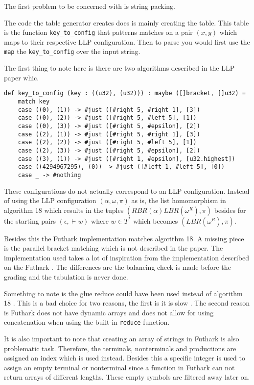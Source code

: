The first problem to be concerned with is string packing. 

The code the table generator creates does is mainly creating the table. This table is the function \lstinline|key_to_config| that patterns matches on a pair $(x, y)$ which maps to their respective LLP configuration. Then to parse you would first use the \lstinline|map| the \lstinline|key_to_config| over the input string.

The first thing to note here is there are two algorithms described in the LLP paper \cite{Vagner2007} whic. 

\begin{lstlisting}[basicstyle=\ttfamily\scriptsize]
def key_to_config (key : ((u32), (u32))) : maybe ([]bracket, []u32) =
    match key
    case ((0), (1)) -> #just ([#right 5, #right 1], [3])
    case ((0), (2)) -> #just ([#right 5, #left 5], [1])
    case ((0), (3)) -> #just ([#right 5, #epsilon], [2])
    case ((2), (1)) -> #just ([#right 5, #right 1], [3])
    case ((2), (2)) -> #just ([#right 5, #left 5], [1])
    case ((2), (3)) -> #just ([#right 5, #epsilon], [2])
    case ((3), (1)) -> #just ([#right 1, #epsilon], [u32.highest])
    case ((4294967295), (0)) -> #just ([#left 1, #left 5], [0])
    case _ -> #nothing
\end{lstlisting}


These configurations do not actually correspond to an LLP configuration. Instead of using the LLP configuration $(\alpha, \omega, \pi)$ as is, the list homomorphism in algorithm 18 \cite[18]{Vagner2007} which results in the tuples $(RBR(\alpha)LBR(\omega^R), \pi)$ besides for the starting pairs $(\epsilon, \vdash w)$ where $w \in T^*$ which becomes $(LBR(\omega^R), \pi)$.



Besides this the Futhark implementation matches algorithm 18. A missing piece is the parallel bracket matching which is not described in the paper. The implementation used takes a lot of inspiration from the implementation described on the Futhark \cite{futhark:parens}. The differences are the balancing check is made before the grading and the tabulation is never done.

Something to note is the glue \cite[7]{Vagner2007} reduce could have been used instead of algorithm 18 \cite[18]{Vagner2007}. This is a bad choice for two reasons, the first is it is slow \cite[17]{Vagner2007}. The second reason is Futhark does not have dynamic arrays and does not allow for using concatenation when using the built-in \lstinline|reduce| function.

It is also important to note that creating an array of strings in Futhark is also problematic task. Therefore, the terminals, nonterminals and productions are assigned an index which is used instead. Besides this a specific integer is used to assign an empty terminal or nonterminal since a function in Futhark can not return arrays of different lengths. These empty symbols are filtered away later on.